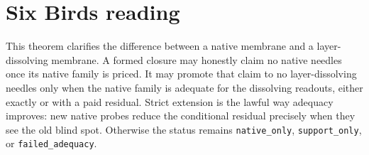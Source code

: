 \documentclass[11pt]{article}
\begin{document}
\section{Six Birds reading}
This theorem clarifies the difference between a native membrane and a layer-dissolving membrane.  A formed closure may honestly claim no native needles once its native family is priced.  It may promote that claim to no layer-dissolving needles only when the native family is adequate for the dissolving readouts, either exactly or with a paid residual.  Strict extension is the lawful way adequacy improves: new native probes reduce the conditional residual precisely when they see the old blind spot.  Otherwise the status remains \texttt{native\_only}, \texttt{support\_only}, or \texttt{failed\_adequacy}.
\end{document}
